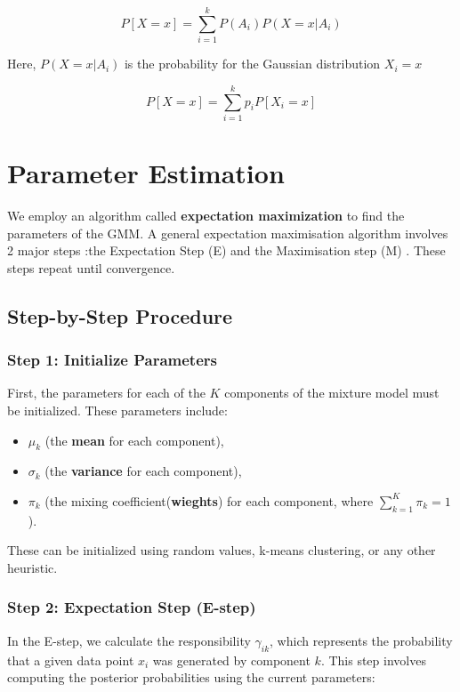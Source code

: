 \documentclass[openany]{book}
\begin{document}
        \[ P[X=x] = \sum_{i=1}^{k} P(A_i) P(X=x | A_i) \]
        
        Here, $P(X=x|A_i)$ is the probability for the Gaussian distribution $X_i = x$
        
        \[ P[X=x] = \sum_{i=1}^{k} p_i P[X_i=x] \]
   
    \section{Parameter Estimation}
        We employ an algorithm called \textbf{ expectation maximization}  to find the parameters of the GMM. A general expectation maximisation algorithm involves 2 major steps :the Expectation Step (E) and the Maximisation step (M) . These steps repeat until convergence.
        
        \subsection*{Step-by-Step Procedure}
        
        \subsubsection*{Step 1: Initialize Parameters}
        
        First, the parameters for each of the \( K \) components of the mixture model must be initialized. These parameters include:
        
        \begin{itemize}
            \item \( \mu_k \) (the \textbf{mean} for each component),
            \item \( \sigma_k \) (the \textbf{variance} for each component),
            \item \( \pi_k \) (the mixing coefficient(\textbf{wieghts}) for each component, where \( \sum_{k=1}^{K} \pi_k = 1 \)).
        \end{itemize}
        
        These can be initialized using random values, k-means clustering, or any other heuristic.
        
        \subsubsection*{Step 2: Expectation Step (E-step)}
        
        In the E-step, we calculate the responsibility \( \gamma_{ik} \), which represents the probability that a given data point \( x_i \) was generated by component \( k \). This step involves computing the posterior probabilities using the current parameters:
        
\end{document}
